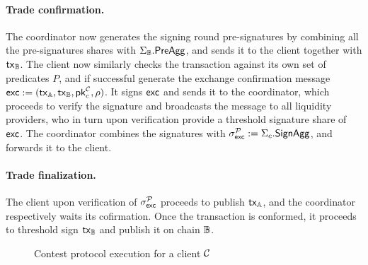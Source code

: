 \paragraph*{Trade confirmation.}
The coordinator now generates the signing round pre-signatures by combining all the pre-signatures shares with $\Sigma_{\mathbb{B}}.\mathsf{PreAgg}$, and sends it to the client together with $\mathsf{tx}_{\mathbb{B}}$. The client now similarly checks the transaction against its own set of predicates $P$, and if successful generate the exchange confirmation message $\mathsf{exc} := (\mathsf{tx}_{\mathbb{A}}, \mathsf{tx}_{\mathbb{B}}, \mathsf{pk}_c^{\mathcal{C}}, \rho)$. It signs $\mathsf{exc}$ and sends it to the coordinator, which proceeds to verify the signature and broadcasts the message to all liquidity providers, who in turn upon verification provide a threshold signature share of $\mathsf{exc}$. The coordinator combines the signatures with $\sigma^{\mathcal{P}}_{\mathsf{exc}} := \Sigma_c.\mathsf{SignAgg}$, and forwards it to the client.
\paragraph*{Trade finalization.}
The client upon verification of $\sigma^{\mathcal{P}}_{\mathsf{exc}}$ proceeds to publish $\mathsf{tx}_{\mathbb{A}}$, and the coordinator respectively waits its cofirmation. Once the transaction is conformed, it proceeds to threshold sign $\mathsf{tx}_{\mathbb{B}}$ and publish it on chain $\mathbb{B}$.

\begin{figure}[H]
    \centering
    \begin{minipage}[t]{1\textwidth}
    \centering
    \begin{pchstack}[boxed]
    \end{pchstack}
    \end{minipage}%
    \caption{Contest protocol execution for a client $\mathcal{C}$}
    \label{fig:dex_refund}
\end{figure}

